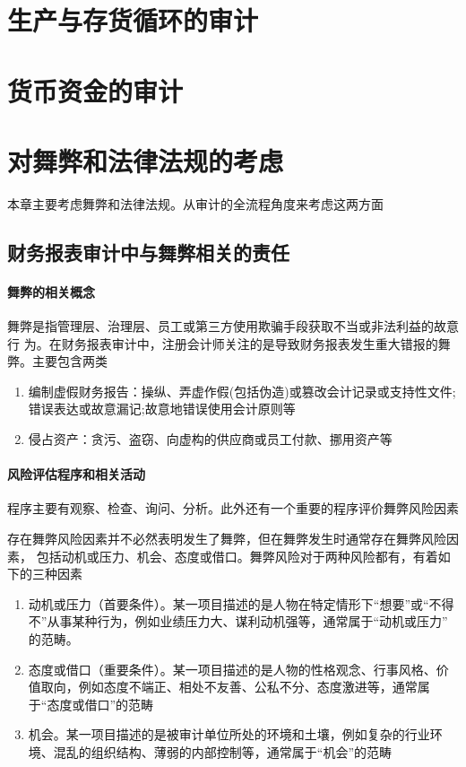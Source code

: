 \documentclass[UTF8,12pt]{ctexart}
\numberwithin{equation}{section} %
\numberwithin{figure}{section}
\numberwithin{table}{section}
\begin{document}
	
	\newpage
	\section{生产与存货循环的审计}
	
	\newpage
	\section{货币资金的审计}
	
	\newpage
	\section{对舞弊和法律法规的考虑}
	本章主要考虑舞弊和法律法规。从审计的全流程角度来考虑这两方面
	
	\subsection{财务报表审计中与舞弊相关的责任}
	
	\paragraph{舞弊的相关概念}
	舞弊是指管理层、治理层、员工或第三方使用欺骗手段获取不当或非法利益的故意行 为。在财务报表审计中，注册会计师关注的是导致财务报表发生重大错报的舞弊。主要包含两类
	\begin{enumerate}
		\item 编制虚假财务报告：操纵、弄虚作假(包括伪造)或篡改会计记录或支持性文件; 错误表达或故意漏记;故意地错误使用会计原则等
		
		\item 侵占资产：贪污、盗窃、向虚构的供应商或员工付款、挪用资产等
	\end{enumerate}
	
	\paragraph{风险评估程序和相关活动}
	程序主要有观察、检查、询问、分析。此外还有一个重要的程序评价舞弊风险因素
	
	存在舞弊风险因素并不必然表明发生了舞弊，但在舞弊发生时通常存在舞弊风险因素， 包括动机或压力、机会、态度或借口。舞弊风险对于两种风险都有，有着如下的三种因素
	\begin{enumerate}
		\item 动机或压力（首要条件）。某一项目描述的是人物在特定情形下“想要”或“不得不”从事某种行为，例如业绩压力大、谋利动机强等，通常属于“动机或压力” 的范畴。
		
		\item 态度或借口（重要条件）。某一项目描述的是人物的性格观念、行事风格、价值取向，例如态度不端正、相处不友善、公私不分、态度激进等，通常属于“态度或借口”的范畴
		
		\item 机会。某一项目描述的是被审计单位所处的环境和土壤，例如复杂的行业环境、混乱的组织结构、薄弱的内部控制等，通常属于“机会”的范畴
	\end{enumerate}
	
\end{document}
